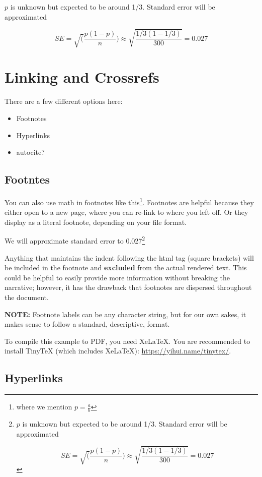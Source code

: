\documentclass[
]{book}
\begin{document}
\(p\) is unknown but expected to be around 1/3. Standard error will be
approximated

\[
SE = \sqrt(\frac{p(1-p)}{n}) \approx \sqrt{\frac{1/3 (1 - 1/3)} {300}} = 0.027
\]

\hypertarget{linking-and-crossrefs}{%
\section*{Linking and Crossrefs}\label{linking-and-crossrefs}}

There are a few different options here:

\begin{itemize}
\item
  Footnotes
\item
  Hyperlinks
\item
  autocite?
\end{itemize}

\hypertarget{footntes}{%
\subsection{Footntes}\label{footntes}}

You can also use math in footnotes like this\footnote{where we mention \(p = \frac{a}{b}\)}. Footnotes
are helpful because they either open to a new page, where you can
re-link to where you left off. Or they display as a literal footnote,
depending on your file format.

We will approximate standard error to 0.027\footnote{\(p\) is unknown but expected to be around 1/3. Standard
  error will be approximated

  \[
  SE = \sqrt(\frac{p(1-p)}{n}) \approx \sqrt{\frac{1/3 (1 - 1/3)} {300}} = 0.027
  \]}

Anything that maintains the indent following the html tag (square
brackets) will be included in the footnote and \textbf{excluded} from the
actual rendered text. This could be helpful to easily provide more
information without breaking the narrative; however, it has the drawback
that footnotes are dispersed throughout the document.

\textbf{NOTE:} Footnote labels can be any character string, but for our own
sakes, it makes sense to follow a standard, descriptive, format.

To compile this example to PDF, you need XeLaTeX. You are recommended to
install TinyTeX (which includes XeLaTeX): \url{https://yihui.name/tinytex/}.

\hypertarget{hyperlinks}{%
\subsection{Hyperlinks}\label{hyperlinks}}
\end{document}
